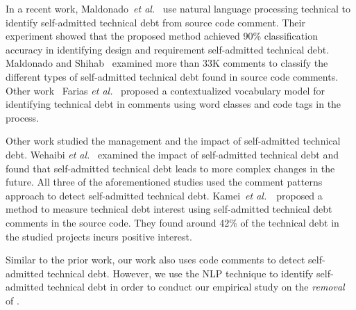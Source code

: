 In a recent work, Maldonado~\textit{et al.}~\cite{Maldonado2015TSE} use natural language processing technical to identify self-admitted technical debt from source code comment. Their experiment showed that the proposed method achieved 90\% classification accuracy in identifying design and requirement self-admitted technical debt.  Maldonado and Shihab~\cite{Maldonado2015MTD} examined more than 33K comments to classify the different types of self-admitted technical debt found in source code comments. Other work~ Farias \textit{et al.}~\cite{Farias2015MTD} proposed a contextualized vocabulary model for identifying technical debt in comments using word classes and code tags in the process.



Other work studied the management and the impact of self-admitted technical debt. Wehaibi \textit{et al.}~\cite{Wehaibi2016SANER} examined the impact of self-admitted technical debt and found that self-admitted technical debt leads to more complex changes in the future. All three of the aforementioned studies used the comment patterns approach to detect self-admitted technical debt. Kamei~\textit{et al.}~\cite{kameiusingTDA2016}~proposed a method to measure technical debt interest using self-admitted technical debt comments in the source code. They found around 42\% of the technical debt in the studied projects incurs positive interest.

 
Similar to the prior work, our work also uses code comments to detect self-admitted technical debt. However, we use the NLP technique to identify self-admitted technical debt in order to conduct our empirical study on the \emph{removal} of \SATD.










